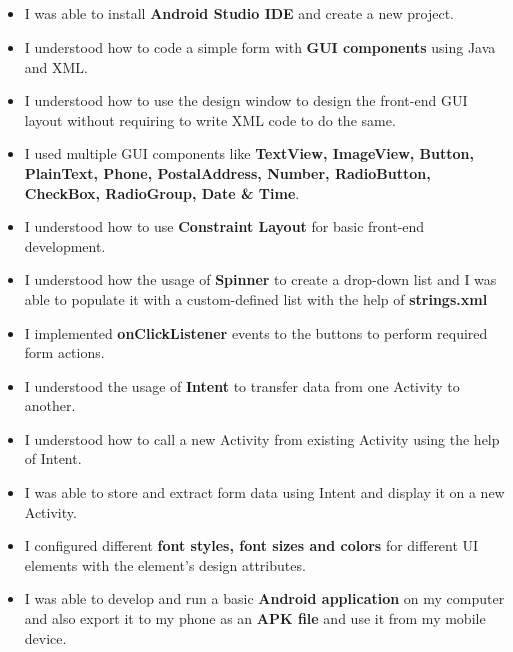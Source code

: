 \documentclass[12pt, a4]{article}
\begin{document}
\subsection*{}
\begin{itemize}
\item I was able to install \textbf{Android Studio IDE} and create a new project.
\item I understood how to code a simple form with \textbf{GUI components} using Java and XML.
\item I understood how to use the design window to design the front-end GUI layout without requiring to write XML code to do the same.
\item I used multiple GUI components like \textbf{TextView, ImageView, Button, PlainText, Phone, PostalAddress, Number, RadioButton, CheckBox, RadioGroup, Date \& Time}.
\item I understood how to use \textbf{Constraint Layout} for basic front-end development.
\item I understood how the usage of \textbf{Spinner} to create a drop-down list and I was able to populate it with a custom-defined list with the help of \textbf{strings.xml}
\item I implemented \textbf{onClickListener} events to the buttons to perform required form actions.
\item I understood the usage of \textbf{Intent} to transfer data from one Activity to another.
\item I understood how to call a new Activity from existing Activity using the help of Intent.
\item I was able to store and extract form data using Intent and display it on a new Activity.
\item I configured different \textbf{font styles, font sizes and colors} for different UI elements with the element's design attributes.
\item I was able to develop and run a basic \textbf{Android application} on my computer and also export it to my phone as an \textbf{APK file} and use it from my mobile device.
\end{itemize}
\end{document}
